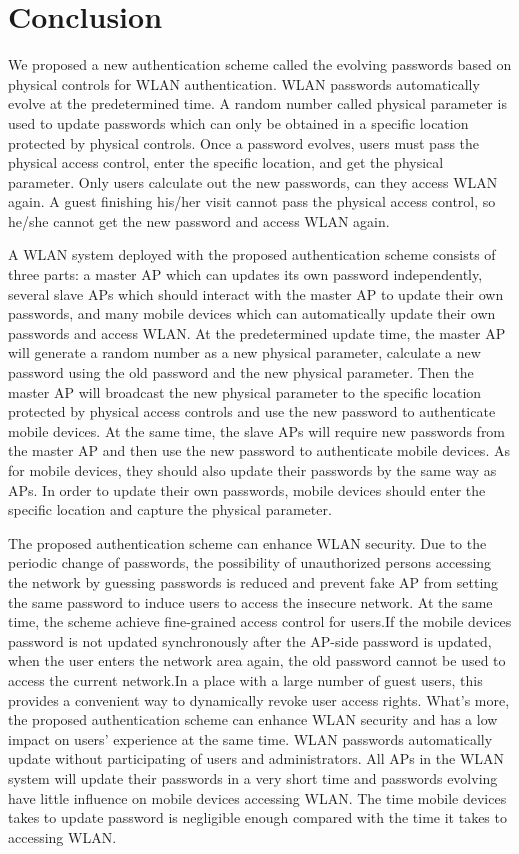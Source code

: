 \section{Conclusion}
We proposed a new authentication scheme called the evolving passwords based on physical controls for WLAN authentication. WLAN passwords automatically evolve at the predetermined time. A random number called physical parameter is used to update passwords which can only be obtained in a specific location protected by physical controls. Once a password evolves, users must pass the physical access control, enter the specific location, and get the physical parameter. Only users calculate out the new passwords,  can they access WLAN again. A guest finishing his/her visit cannot pass the physical access control, so he/she cannot get the new password and access WLAN again. 


A WLAN system deployed with the proposed authentication scheme consists of three parts: a master AP which can updates its own password independently, several slave APs which should interact with the master AP to update their own passwords, and many mobile devices which can automatically update their own passwords and access WLAN. At the predetermined update time, the master AP will generate a random number as a new physical parameter, calculate a new password using the old password and the new physical parameter. Then the master AP will broadcast the new physical parameter to the specific location protected by physical access controls and use the new password to authenticate mobile devices. At the same time, the slave APs will require new passwords from the master AP and then use the new password to authenticate mobile devices. As for mobile devices, they should also update their passwords by the same way as APs. In order to update their own passwords, mobile devices should enter the specific location and capture the physical parameter. 


The proposed authentication scheme can enhance WLAN security. Due to the periodic change of passwords, the possibility of unauthorized persons accessing the network by guessing passwords is reduced and prevent fake AP from setting the same password to induce users to access the insecure network. At the same time, the scheme achieve fine-grained access control for users.If the mobile devices password is not updated synchronously after the AP-side password is updated, when the user enters the network area again, the old password cannot be used to access the current network.In a place with a large number of guest users, this provides a convenient way to dynamically revoke user access rights. What’s more, the proposed authentication scheme can enhance WLAN security and  has a low impact on users’ experience at the same time. WLAN passwords automatically update without participating of users and administrators. All APs in the WLAN system will update their passwords in a very short time and passwords evolving have little influence on mobile devices accessing WLAN. The time mobile devices takes to update password is negligible enough compared with the time it takes to accessing WLAN. 
